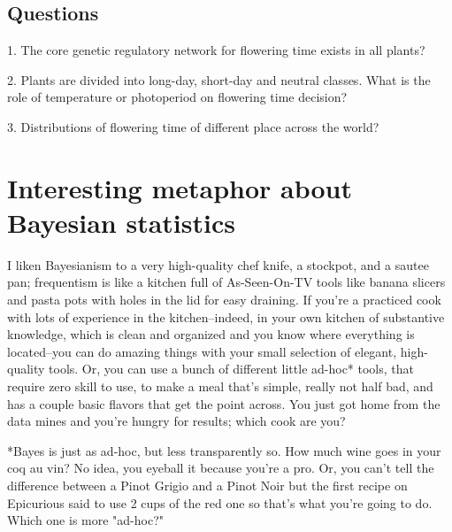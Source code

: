 \documentclass[paper=a4, fontsize=12pt]{scrartcl}	%
\numberwithin{equation}{section}					%
\numberwithin{figure}{section}					%
\numberwithin{table}{section}					%
\begin{document}
\subsection{Questions}
1. The core genetic regulatory network for flowering time exists in all plants?

2. Plants are divided into long-day, short-day and neutral classes. What is the role of temperature or photoperiod on flowering time decision?

3. Distributions of flowering time of different place across the world?
\section{Interesting metaphor about Bayesian statistics}
I liken Bayesianism to a very high-quality chef knife, a stockpot, and a sautee pan; frequentism is like a kitchen full of As-Seen-On-TV tools like banana slicers and pasta pots with holes in the lid for easy draining. If you're a practiced cook with lots of experience in the kitchen--indeed, in your own kitchen of substantive knowledge, which is clean and organized and you know where everything is located--you can do amazing things with your small selection of elegant, high-quality tools. Or, you can use a bunch of different little ad-hoc* tools, that require zero skill to use, to make a meal that's simple, really not half bad, and has a couple basic flavors that get the point across. You just got home from the data mines and you're hungry for results; which cook are you?

*Bayes is just as ad-hoc, but less transparently so. How much wine goes in your coq au vin? No idea, you eyeball it because you're a pro. Or, you can't tell the difference between a Pinot Grigio and a Pinot Noir but the first recipe on Epicurious said to use 2 cups of the red one so that's what you're going to do. Which one is more "ad-hoc?"
\end{document}
